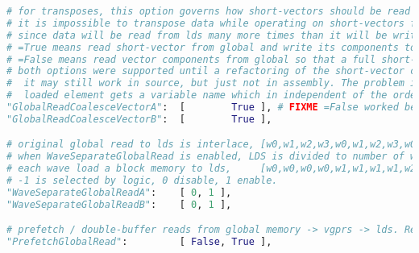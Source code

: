 \documentclass[]{article}
\begin{document}
\begin{lstlisting}[language=python,breaklines=true]
# for transposes, this option governs how short-vectors should be read from global and written to lds
# it is impossible to transpose data while operating on short-vectors for GlobalRead,LocalWrite and LocalRead; an odd number of those must be transposing and operating on vector components.
# since data will be read from lds many more times than it will be written, data must always end up in lds such that short-vectors can be read from lds
# =True means read short-vector from global and write its components to lds
# =False means read vector components from global so that a full short-vector can be written to lds
# both options were supported until a refactoring of the short-vector code (necessary to enable assembly) broke it. Since =True always seems to be faster, no time has been spend on fixing =False
#  it may still work in source, but just not in assembly. The problem is the order in which elements are stored into vgprs, is different than the order in which they are written to lds. In source each
#  loaded element gets a variable name which in independent of the order that they are written in the source code, but in assembly the values are just assigned vgprs in order and that order needs to be shuffles.
"GlobalReadCoalesceVectorA":  [        True ], # FIXME =False worked before the vector refactor; fixing requires re-ordering load/store indices; but they aren't the faster option so not worth time right now
"GlobalReadCoalesceVectorB":  [        True ],

# original global read to lds is interlace, [w0,w1,w2,w3,w0,w1,w2,w3,w0,w1,w2,w3,w0,w1,w2,w3]
# when WaveSeparateGlobalRead is enabled, LDS is divided to number of waves part.
# each wave load a block memory to lds,     [w0,w0,w0,w0,w1,w1,w1,w1,w2,w2,w2,w2,w3,w3,w3,w3]
# -1 is selected by logic, 0 disable, 1 enable.
"WaveSeparateGlobalReadA":    [ 0, 1 ],
"WaveSeparateGlobalReadB":    [ 0, 1 ],

# prefetch / double-buffer reads from global memory -> vgprs -> lds. Requires 2X LDS space, and VGPRs for buffering data on way into LDS
"PrefetchGlobalRead":         [ False, True ],


\end{lstlisting}
\end{document}
